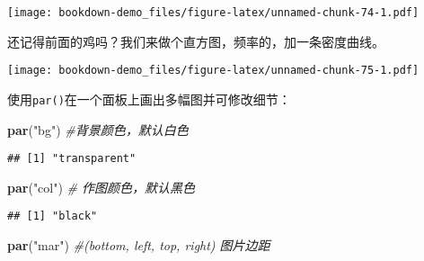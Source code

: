 \documentclass[]{book}
\newenvironment{Shaded}{\begin{snugshade}}{\end{snugshade}}
\newcommand{\CommentTok}[1]{\textcolor[rgb]{0.56,0.35,0.01}{\textit{#1}}}
\newcommand{\DecValTok}[1]{\textcolor[rgb]{0.00,0.00,0.81}{#1}}
\newcommand{\KeywordTok}[1]{\textcolor[rgb]{0.13,0.29,0.53}{\textbf{#1}}}
\newcommand{\NormalTok}[1]{#1}
\newcommand{\OperatorTok}[1]{\textcolor[rgb]{0.81,0.36,0.00}{\textbf{#1}}}
\newcommand{\StringTok}[1]{\textcolor[rgb]{0.31,0.60,0.02}{#1}}
\begin{document}
\texttt{[image: bookdown-demo\_files/figure-latex/unnamed-chunk-74-1.pdf]}

还记得前面的鸡吗？我们来做个直方图，频率的，加一条密度曲线。

\begin{Shaded}
\end{Shaded}

\texttt{[image: bookdown-demo\_files/figure-latex/unnamed-chunk-75-1.pdf]}

使用\texttt{par()}在一个面板上画出多幅图并可修改细节：

\begin{Shaded}
\begin{Highlighting}[]
\KeywordTok{par}\NormalTok{(}\StringTok{"bg"}\NormalTok{) }\CommentTok{#背景颜色，默认白色}
\end{Highlighting}
\end{Shaded}

\begin{verbatim}
## [1] "transparent"
\end{verbatim}

\begin{Shaded}
\begin{Highlighting}[]
\KeywordTok{par}\NormalTok{(}\StringTok{"col"}\NormalTok{) }\CommentTok{# 作图颜色，默认黑色}
\end{Highlighting}
\end{Shaded}

\begin{verbatim}
## [1] "black"
\end{verbatim}

\begin{Shaded}
\begin{Highlighting}[]
\KeywordTok{par}\NormalTok{(}\StringTok{"mar"}\NormalTok{) }\CommentTok{#(bottom, left, top, right) 图片边距}
\end{Highlighting}
\end{Shaded}
\end{document}
